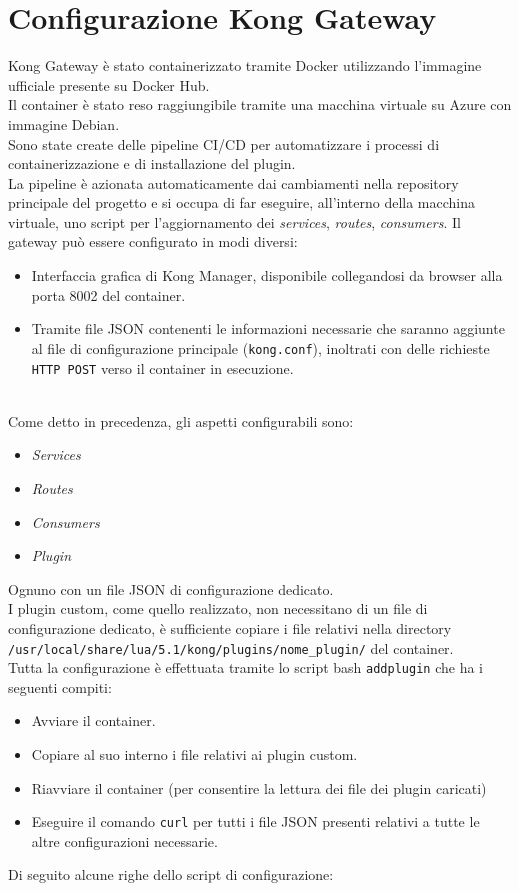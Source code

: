 \section{Configurazione Kong Gateway}\label{sec:kongconf}
Kong Gateway è stato containerizzato tramite Docker utilizzando l'immagine ufficiale presente su Docker Hub.\\
Il container è stato reso raggiungibile tramite una macchina virtuale su Azure con immagine Debian.\\
Sono state create delle pipeline CI/CD per automatizzare i processi di containerizzazione e di installazione del plugin.\\
La pipeline è azionata automaticamente dai cambiamenti nella repository principale del progetto e si occupa di far eseguire, all'interno della macchina virtuale, 
uno script per l'aggiornamento dei \emph{services}, \emph{routes}, \emph{consumers}.
\newpage
Il gateway può essere configurato in modi diversi:
\begin{itemize}
\item Interfaccia grafica di Kong Manager, disponibile collegandosi da browser alla porta 8002 del container.
\item Tramite file JSON contenenti le informazioni necessarie che saranno aggiunte al file di configurazione principale (\texttt{kong.conf}), inoltrati con delle richieste \texttt{HTTP POST} verso il container in esecuzione.
\end{itemize}
\ \\
Come detto in precedenza, gli aspetti configurabili sono:
\begin{itemize}
	\item\emph{Services}
	\item\emph{Routes}
	\item\emph{Consumers}
	\item\emph{Plugin}
\end{itemize}

Ognuno con un file JSON di configurazione dedicato.\\
I plugin custom, come quello realizzato, non necessitano di un file di configurazione dedicato, è sufficiente copiare i file relativi nella directory\\
\texttt{/usr/local/share/lua/5.1/kong/plugins/nome\_plugin/} del container.\\

Tutta la configurazione è effettuata tramite lo script bash \texttt{addplugin} che ha i seguenti compiti:
\begin{itemize}
\item Avviare il container.
\item Copiare al suo interno i file relativi ai plugin custom.
\item Riavviare il container (per consentire la lettura dei file dei plugin caricati)
\item Eseguire il comando \texttt{curl} per tutti i file JSON presenti relativi a tutte le altre configurazioni necessarie.
\end{itemize}
\newpage
Di seguito alcune righe dello script di configurazione:

